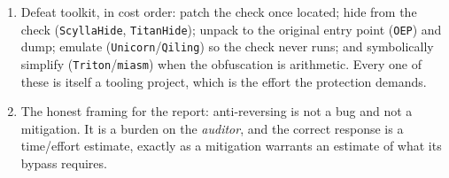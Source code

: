 \documentclass[12pt]{Training}
\begin{document}
\begin{enumerate}
\begin{enumerate}
        \item \textbf{Obfuscation}: control-flow flattening (one dispatcher block with a state variable compared in every successor), MBA expressions, opaque predicates that are always true but not provably so, encrypted strings decrypted at use, and instruction substitution. LLVM-based obfuscators (\lstinline{OLLVM}, \lstinline{tigress}) leave recognizable shapes.
        \item \textbf{Integrity checks}: a hash or CRC over the code section, computed and compared at startup; the comparison site is the patch point, and the recompute is the resign step.
    \end{enumerate}
    \item Defeat toolkit, in cost order: patch the check once located; hide from the check (\lstinline{ScyllaHide}, \lstinline{TitanHide}); unpack to the original entry point (\lstinline{OEP}) and dump; emulate (\lstinline{Unicorn}/\lstinline{Qiling}) so the check never runs; and symbolically simplify (\lstinline{Triton}/\lstinline{miasm}) when the obfuscation is arithmetic. Every one of these is itself a tooling project, which is the effort the protection demands.
    \item The honest framing for the report: anti-reversing is not a bug and not a mitigation. It is a burden on the \emph{auditor}, and the correct response is a time/effort estimate, exactly as a mitigation warrants an estimate of what its bypass requires.
\end{enumerate}
\end{document}
